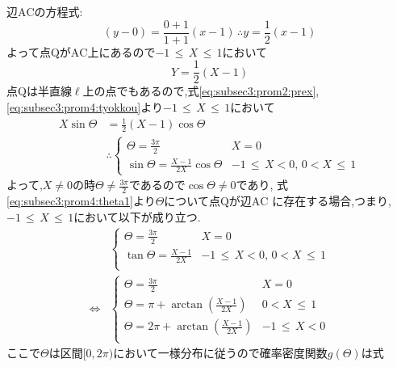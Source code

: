 \begin{enumerate}[(1)]
  辺$\mathrm{AC}$の方程式:
  \begin{equation*}
    (y - 0) = \frac{0 + 1}{1 + 1}(x - 1)\, \therefore y = \frac{1}{2}(x - 1)
  \end{equation*}
  よって点$\mathrm{Q}$が$\mathrm{AC}$上にあるので$-1\, \leq\,  X\, \leq \, 1$において
  \begin{equation}
    Y = \frac{1}{2}(X - 1)\label{eq:subsec3:prom4:tyokkou}
  \end{equation}
  点$\mathrm{Q}$は半直線$\ell$上の点でもあるので,式\eqref{eq:subsec3:prom2:prex}, 
  \eqref{eq:subsec3:prom4:tyokkou}より$-1\, \leq\,  X\, \leq \, 1$において
  \begin{align}
    X\sin\Theta &= \frac{1}{2}\left(X - 1\right)\cos\Theta\nonumber\\
                &\therefore
                  \begin{cases}
                    \Theta = \frac{3\pi}{2} & X = 0\\
                    \sin\Theta = \frac{X - 1}{2X}\cos\Theta & -1\, \leq\, X < 0,\, 0 < X\, \leq\, 1
        \end{cases}\label{eq:subsec3:prom4:theta1}
  \end{align}
  よって,$X \neq 0$の時$\Theta \neq \frac{3\pi}{2}$であるので$\cos\Theta \neq 0$であり,
  式\eqref{eq:subsec3:prom4:theta1}より$\Theta$について点$\mathrm{Q}$が辺$\mathrm{AC}$
  に存在する場合,つまり,$-1\, \leq\, X\, \leq\, 1$において以下が成り立つ.
  \begin{align}
    &\begin{cases}
      \Theta = \frac{3\pi}{2} & X = 0\\
      \tan\Theta = \frac{X - 1}{2X} & -1\, \leq\, X < 0,\, 0 < X\, \leq\, 1\\
    \end{cases}\nonumber\\
    \Longleftrightarrow&
                         \begin{cases}
                           \Theta = \frac{3\pi}{2} & X = 0\\
                           \Theta = \pi + \arctan\left(\frac{X - 1}{2X}\right) & 0 < X \, \leq\, 1\\
                           \Theta = 2\pi + \arctan\left(\frac{X - 1}{2X}\right) & -1\, \leq\, X < 0\\
                         \end{cases}\label{eq:subsec3:prom4:theta2}
  \end{align}
  ここで$\Theta$は区間$[0, 2\pi)$において一様分布に従うので確率密度関数$g(\Theta)$は式

\end{enumerate}
